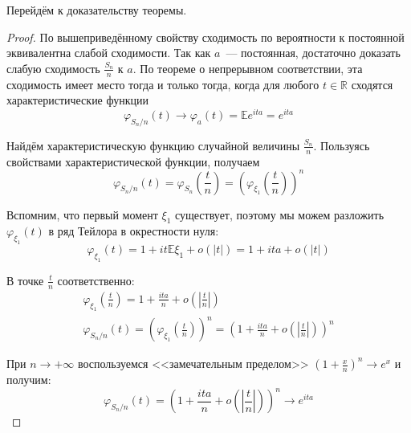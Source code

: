 Перейдём к доказательству теоремы.

\begin{proof}
    По вышеприведённому свойству сходимость по вероятности к постоянной эквивалентна слабой сходимости. Так как $a$~--- постоянная, достаточно доказать слабую сходимость $\frac{S_{n}}{n}$ к $a$. По теореме о непрерывном соответствии, эта сходимость имеет место тогда и только тогда, когда для любого $t \in \mathbb{R}$ сходятся характеристические функции
    \begin{equation*}
        \varphi_{S_{n} / n}(t) \rightarrow \varphi_{a}(t)=\mathbb{E} e^{i t a}=e^{i t a}
    \end{equation*}
    
    Найдём характеристическую функцию случайной величины $\frac{S_{n}}{n}$. Пользуясь свойствами характеристической функции, получаем
    \begin{equation*}
        \varphi_{S_{n} / n}(t)=\varphi_{S_{n}}\left(\frac{t}{n}\right)=\left(\varphi_{\xi_{1}}\left(\frac{t}{n}\right)\right)^{n}
    \end{equation*}
    
    Вспомним, что первый момент $\xi_{1}$ существует, поэтому мы можем разложить $\varphi_{\xi_{1}}(t)$ в ряд Тейлора в окрестности нуля:
    \begin{equation*}
        \varphi_{\xi_{1}}(t)=1+i t \mathbb{E} \xi_{1}+o(|t|)=1+i t a+o(|t|)
    \end{equation*}
    
    В точке $\frac{t}{n}$ соответственно:
    \begin{gather*}
        \varphi_{\xi_{1}}\left(\frac{t}{n}\right)=1+\frac{i t a}{n}+o\left(\left|\frac{t}{n}\right|\right) \\
        \varphi_{S_{n} / n}(t)=\left(\varphi_{\xi_{1}}\left(\frac{t}{n}\right)\right)^{n}=\left(1+\frac{i t a}{n}+o\left(\left|\frac{t}{n}\right|\right)\right)^{n}
    \end{gather*}
    
    При $n \to +\infty$ воспользуемся <<замечательным пределом>> $\left(1+\frac{x}{n}\right)^{n} \rightarrow e^{x}$ и получим:
    \begin{equation*}
        \varphi_{S_{n} / n}(t)=\left(1+\frac{i t a}{n}+o\left(\left|\frac{t}{n}\right|\right)\right)^{n} \rightarrow e^{i t a}
    \end{equation*}
\end{proof}

